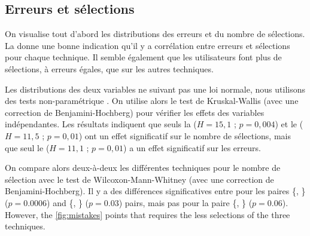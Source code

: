 
\subsection{Erreurs et sélections}
\label{subsec:experiment_results_errors}

On visualise tout d'abord les distributions des erreurs et du nombre de sélections. La  donne une bonne indication qu'il y a corrélation entre erreurs et sélections pour chaque technique. Il semble également que les utilisateurs  font plus de sélections, à erreurs égales, que sur les autres techniques.


Les distributions des deux variables ne suivant pas une loi normale, nous utilisons des tests non-paramétrique \citep{Wobbrock2016}. On utilise alors le test de Kruskal-Wallis (avec une correction de Benjamini-Hochberg) pour vérifier les effets des variables indépendantes. Les résultats indiquent que seuls la  ($H = 15,1$ ; $p = 0,004$) et le  ($H = 11,5$ ; $p = 0,01$) ont un effet significatif sur le nombre de sélections, mais que seul le  ($H = 11,1$ ; $p = 0,01$) a un effet significatif sur les erreurs.

On compare alors deux-à-deux les différentes techniques pour le nombre de sélection avec le test de Wilcoxon-Mann-Whitney (avec une correction de Benjamini-Hochberg). Il y a des différences significatives entre pour les paires \{, \} ($p = 0.0006$) and \{, \} ($p = 0.03$) pairs, mais pas pour la paire \{, \} ($p = 0.06$). However, the \autoref{fig:mistakes} points that  requires the less selections of the three techniques.


